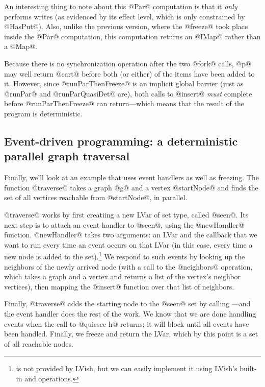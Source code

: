 \singlespacing

\doublespacing

An interesting thing to note about this @Par@ computation is that it
\emph{only} performs writes (as evidenced by its effect level, which
is only constrained by @HasPut@).  Also, unlike the previous version,
where the @freeze@ took place inside the @Par@ computation, this
computation returns an @IMap@ rather than a @Map@.

Because there is no synchronization operation after the two @fork@
calls, @p@ may well return @cart@ before both (or either) of the items
have been added to it.  However, since @runParThenFreeze@ is an
implicit global barrier (just as @runPar@ and @runParQuasiDet@ are),
both calls to @insert@ \emph{must} complete before @runParThenFreeze@
can return---which means that the result of the program is
deterministic.

\subsection{Event-driven programming: a deterministic parallel graph traversal}

Finally, we'll look at an example that uses event handlers as well as
freezing.  The function @traverse@ takes a graph @g@ and a vertex
@startNode@ and finds the set of all vertices reachable from
@startNode@, in parallel.

\singlespacing

\doublespacing

@traverse@ works by first creatiing a new LVar of set type, called
@seen@.  Its next step is to attach an event handler to @seen@, using
the @newHandler@ function.  @newHandler@ takes two arguments: an LVar
and the callback that we want to run every time an event occurs on
that LVar (in this case, every time a new node is added to the
set).\footnote{ is not provided by LVish, but we can
  easily implement it using LVish's built-in  and
   operations.}
We respond to such events by looking up the neighbors of the newly
arrived node (with a call to the @neighbors@ operation, which takes a
graph and a vertex and returns a list of the vertex's neighbor
vertices), then mapping the @insert@ function over that list of
neighbors.

Finally, @traverse@ adds the starting node to the @seen@ set by
calling ---and the event handler does the
rest of the work.  We know that we are done handling events when the
call to @quiesce h@ returns; it will block until all events have been
handled.  Finally, we freeze and return the LVar, which by this point
is a set of all reachable nodes.

